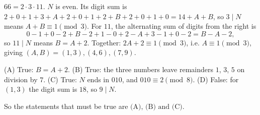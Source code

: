 $66=2\cdot3\cdot11$. $N$ is even. Its digit sum is $2+0+1+3+A+2+0+1+2+B+2+0+1+0=14+A+B$, so $3\mid N$ means $A+B\equiv1\pmod3$. For $11$, the alternating sum of digits from the right is
\[
0-1+0-2+B-2+1-0+2-A+3-1+0-2=B-A-2,
\]
so $11\mid N$ means $B=A+2$. Together: $2A+2\equiv1\pmod3$, i.e. $A\equiv1\pmod3$, giving $(A,B)=(1,3),(4,6),(7,9)$.

(A) True: $B=A+2$. (B) True: the three numbers leave remainders $1$, $3$, $5$ on division by $7$. (C) True: $N$ ends in $010$, and $010\equiv2\pmod8$. (D) False: for $(1,3)$ the digit sum is $18$, so $9\mid N$.

So the statements that must be true are $\boxed{\text{(A), (B) and (C)}}$.
